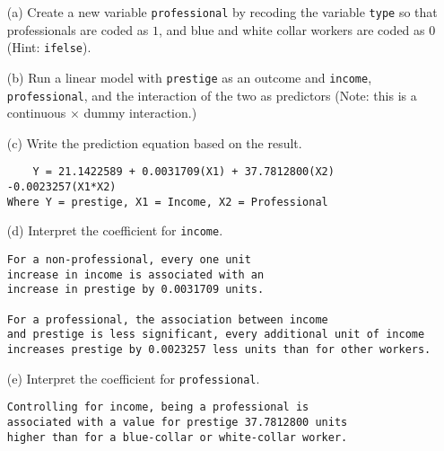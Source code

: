 \documentclass[12pt,letterpaper]{article}
\begin{document}
\newpage
\begin{enumerate}
	
	\item [(a)]
	Create a new variable \texttt{professional} by recoding the variable \texttt{type} so that professionals are coded as $1$, and blue and white collar workers are coded as $0$ (Hint: \texttt{ifelse}).


	
	\vspace{6cm}
	
	
	\item [(b)]
	Run a linear model with \texttt{prestige} as an outcome and \texttt{income}, \texttt{professional}, and the interaction of the two as predictors (Note: this is a continuous $\times$ dummy interaction.)
	


	\vspace{6cm}
	\item [(c)]
	Write the prediction equation based on the result.

\begin{verbatim}
	Y = 21.1422589 + 0.0031709(X1) + 37.7812800(X2) -0.0023257(X1*X2)
Where Y = prestige, X1 = Income, X2 = Professional
\end{verbatim}
	
\newpage
	\item [(d)]
	Interpret the coefficient for \texttt{income}.

\begin{verbatim}
For a non-professional, every one unit
increase in income is associated with an
increase in prestige by 0.0031709 units.

For a professional, the association between income
and prestige is less significant, every additional unit of income
increases prestige by 0.0023257 less units than for other workers.
\end{verbatim}
	
	\vspace{10cm}	
	\item [(e)]
	Interpret the coefficient for \texttt{professional}.

\begin{verbatim}
Controlling for income, being a professional is
associated with a value for prestige 37.7812800 units
higher than for a blue-collar or white-collar worker.
\end{verbatim}
	


\end{enumerate}
\end{document}

